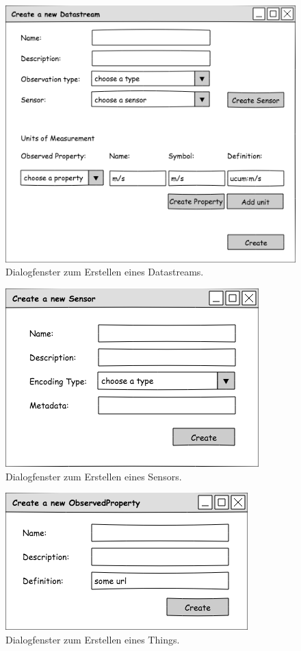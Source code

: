 \documentclass[12 pt]{article}
\begin{document}
	\begin{figure}[ht]
		\centering
		\includegraphics[scale=1]{images/create_datastream}
		\caption{\label{fig:ds}Dialogfenster zum Erstellen eines Datastreams.}
	\end{figure}
	
	\begin{figure}[ht]
		\centering
		\includegraphics[scale=1]{images/create_sensor}
		\caption{\label{fig:sensor}Dialogfenster zum Erstellen eines Sensors.}
	\end{figure}
	
	\begin{figure}[ht]
		\centering
		\includegraphics[scale=1]{images/create_observedproperty}
		\caption{\label{fig:obsProp}Dialogfenster zum Erstellen eines Things.}
	\end{figure}
	
\end{document}
